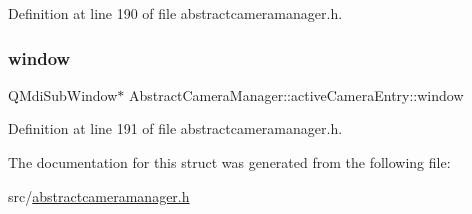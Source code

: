 Definition at line 190 of file abstractcameramanager.\+h.

\mbox{\label{struct_abstract_camera_manager_1_1active_camera_entry_a58a76914d71ad9d8b3ab6b16849e7161}} 
\subsubsection{\texorpdfstring{window}{window}}
{\footnotesize\ttfamily Q\+Mdi\+Sub\+Window$\ast$ Abstract\+Camera\+Manager\+::active\+Camera\+Entry\+::window}



Definition at line 191 of file abstractcameramanager.\+h.



The documentation for this struct was generated from the following file\+:\begin{DoxyCompactItemize}
\item 
src/\mbox{\hyperlink{abstractcameramanager_8h}{abstractcameramanager.\+h}}\end{DoxyCompactItemize}

